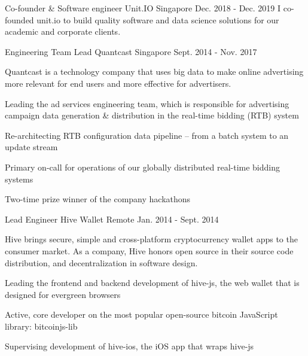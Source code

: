 

\begin{cventries}

  \cventry
    {Co-founder \& Software engineer} %
    {Unit.IO} %
    {Singapore} %
    {Dec. 2018 - Dec. 2019} %
    {
      I co-founded unit.io to build quality software and data science solutions for our academic and corporate clients.
    }

  \cventry
    {Engineering Team Lead} %
    {Quantcast} %
    {Singapore} %
    {Sept. 2014 - Nov. 2017} %
    {
      Quantcast is a technology company that uses big data to make online advertising more relevant for end users and more effective for advertisers.
      \begin{cvitems} %
        \item Leading the ad services engineering team, which is responsible for advertising campaign data generation \& distribution in the real-time bidding (RTB) system
        \item Re-architecting RTB configuration data pipeline – from a batch system to an update stream
        \item Primary on-call for operations of our globally distributed real-time bidding systems
        \item Two-time prize winner of the company hackathons
      \end{cvitems}
    }

  \cventry
    {Lead Engineer} %
    {Hive Wallet} %
    {Remote} %
    {Jan. 2014 - Sept. 2014} %
    {
      Hive brings secure, simple and cross-platform cryptocurrency wallet apps to the consumer market. As a company, Hive honors open source in their source code distribution, and decentralization in software design.
      \begin{cvitems} %
        \item Leading the frontend and backend development of hive-js, the web wallet that is designed for evergreen browsers
        \item Active, core developer on the most popular open-source bitcoin JavaScript library: bitcoinjs-lib
        \item Supervising development of hive-ios, the iOS app that wraps hive-js
      \end{cvitems}
    }


\end{cventries}
